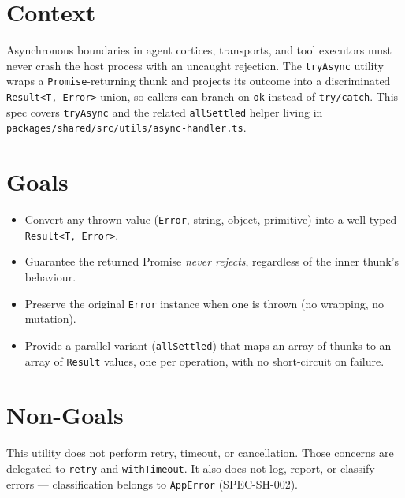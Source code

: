 



\makespecheader

\section{Context}
Asynchronous boundaries in agent cortices, transports, and tool executors must never crash the host process with an uncaught rejection. The \texttt{tryAsync} utility wraps a \texttt{Promise}-returning thunk and projects its outcome into a discriminated \texttt{Result<T, Error>} union, so callers can branch on \texttt{ok} instead of \texttt{try/catch}. This spec covers \texttt{tryAsync} and the related \texttt{allSettled} helper living in \texttt{packages/shared/src/utils/async-handler.ts}.

\section{Goals}
\begin{itemize}[leftmargin=1.2em]
  \item Convert any thrown value (\texttt{Error}, string, object, primitive) into a well-typed \texttt{Result<T, Error>}.
  \item Guarantee the returned Promise \emph{never rejects}, regardless of the inner thunk's behaviour.
  \item Preserve the original \texttt{Error} instance when one is thrown (no wrapping, no mutation).
  \item Provide a parallel variant (\texttt{allSettled}) that maps an array of thunks to an array of \texttt{Result} values, one per operation, with no short-circuit on failure.
\end{itemize}

\section{Non-Goals}
\begin{nongoal}
This utility does not perform retry, timeout, or cancellation. Those concerns are delegated to \texttt{retry} and \texttt{withTimeout}. It also does not log, report, or classify errors --- classification belongs to \texttt{AppError} (SPEC-SH-002).
\end{nongoal}


